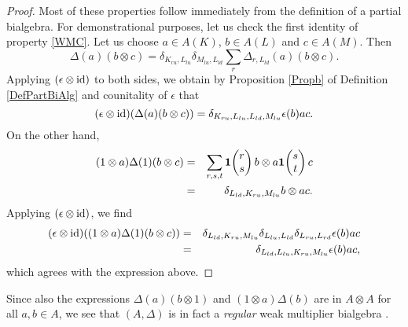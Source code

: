 \begin{proof} Most of these properties follow immediately from the definition of a partial bialgebra. For demonstrational purposes, let us check the first identity of property \ref{WMC}. Let us choose $a\in A(K)$, $b\in A(L)$ and $c\in A(M)$. Then \[\Delta(a)(b\otimes c) = \delta_{K_{ru},L_{lu}}\delta_{M_{lu},L_{ld}} \sum_r \Delta_{r,L_{ld}}(a)(b\otimes c).\]  Applying $(\epsilon\otimes \operatorname{id})$ to both sides, we obtain by Proposition \ref{Propb} of Definition \ref{DefPartBiAlg} and counitality of $\epsilon$ that \[(\epsilon \otimes \operatorname{id})(\Delta(a)(b\otimes c)) = \delta_{K_{ru},L_{lu},L_{ld},M_{lu}} \epsilon(b) ac.\] On the other hand, \begin{eqnarray*} (1\otimes a)\Delta(1)(b\otimes c) &=& \sum_{r,s,t} \mathbf{1}\!\begin{pmatrix} r \\ s\end{pmatrix} b \otimes a\mathbf{1}\!\begin{pmatrix} s \\ t\end{pmatrix}c \\ &=& \delta_{L_{ld},K_{ru},M_{lu}} b \otimes ac.\end{eqnarray*} Applying $(\epsilon\otimes \operatorname{id})$, we find \begin{eqnarray*} (\epsilon\otimes \operatorname{id})( (1\otimes a)\Delta(1)(b\otimes c) ) &=&  \delta_{L_{ld},K_{ru},M_{lu}}\delta_{L_{lu},L_{ld}}\delta_{L_{ru},L_{rd}} \epsilon(b)ac \\ &=&  \delta_{L_{ld},L_{lu},K_{ru},M_{lu}} \epsilon(b)ac,\end{eqnarray*} which agrees with the expression above.
\end{proof} 

\begin{Rem} 
Since also the expressions $\Delta(a)(b\otimes 1)$ and $(1\otimes a)\Delta(b)$ are in $A\otimes A$ for all $a,b\in A$, we see that $(A,\Delta)$ is in fact a \emph{regular} weak multiplier bialgebra \cite[Definition 2.3]{Boh1}.
\end{Rem} 




